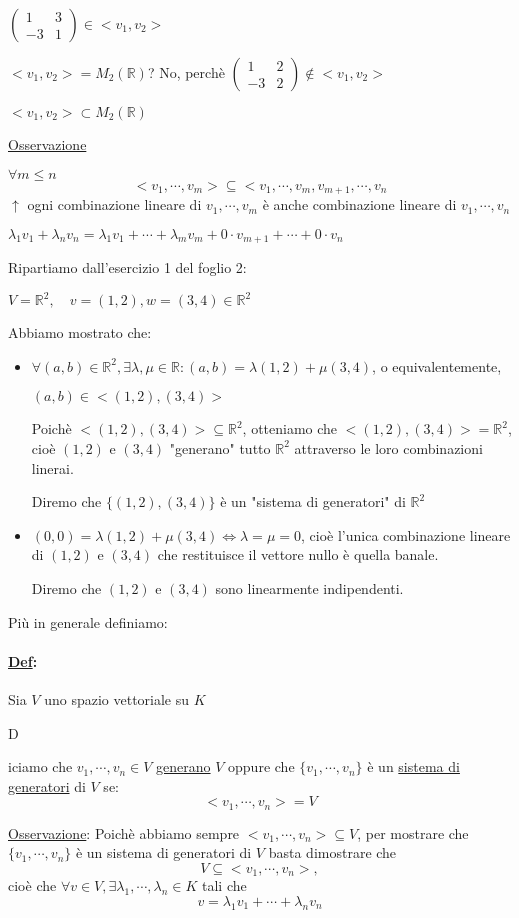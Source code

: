 \documentclass{article}
\newcommand{\ul}[1]{\underline{#1}}
\newcommand{\R}{\mathbb{R}}
\newcommand{\Def}[2]{\paragraph{\ul{Def}:}#1\\\hspace*{3em}\begin{minipage}{.8\textwidth}#2\end{minipage}}
\begin{document}
\begin{itemize}
	  $\begin{pmatrix}1&3\\-3&1\end{pmatrix}\in<v_1,v_2>$

	  $<v_1,v_2>=M_2(\R)$? No, perchè $\begin{pmatrix}1&2\\-3&2\end{pmatrix}\not\in<v_1,v_2>$

	  $<v_1,v_2>\subset M_2(\R)$

	  \ul{Osservazione}

	  $\forall m\leq n$
	  $$<v_1,\cdots,v_m>\subseteq <v_1,\cdots,v_m,v_{m+1},\cdots,v_n$$
	  $\uparrow$ ogni combinazione lineare di $v_1,\cdots,v_m$ è anche combinazione lineare di $v_1,\cdots,v_n$

	  $\lambda_1v_1+\lambda_nv_n=\lambda_1v_1+\cdots+\lambda_mv_m+0\cdot v_{m+1}+\cdots+0\cdot v_n$
\end{itemize}
Ripartiamo dall'esercizio 1 del foglio 2:

$V=\R^2,\quad v=(1,2),w=(3,4)\in\R^2$

Abbiamo mostrato che:
\begin{itemize}
	\item $\forall(a,b)\in\R^2,\exists\lambda,\mu\in\R:(a,b)=\lambda(1,2)+\mu(3,4)$, o equivalentemente,

	  $(a,b)\in<(1,2),(3,4)>$

	  Poichè $<(1,2),(3,4)>\subseteq\R^2$, otteniamo che $<(1,2),(3,4)>=\R^2$, cioè $(1,2)$ e $(3,4)$ "generano" tutto $\R^2$ attraverso le loro combinazioni linerai.

	  Diremo che $\{(1,2),(3,4)\}$ è un "sistema di generatori" di $\R^2$
	\item $(0,0)=\lambda(1,2)+\mu(3,4)\Leftrightarrow\lambda=\mu=0$, cioè l'unica combinazione lineare di $(1,2)$ e $(3,4)$ che restituisce il vettore nullo è quella banale.

	  Diremo che $(1,2)$ e $(3,4)$ sono linearmente indipendenti.
\end{itemize}

Più in generale definiamo:

\Def{Sia $V$ uno spazio vettoriale su $K$}

Diciamo che $v_1,\cdots,v_n\in V$ \ul{generano} $V$ oppure che $\{v_1,\cdots,v_n\}$ è un \ul{sistema di generatori} di $V$ se:
$$<v_1,\cdots,v_n>=V$$

\ul{Osservazione}: Poichè abbiamo sempre $<v_1,\cdots,v_n>\subseteq V$, per mostrare che $\{v_1,\cdots,v_n\}$ è un sistema di generatori di $V$ basta dimostrare che
$$V\subseteq<v_1,\cdots,v_n>,$$
cioè che $\forall v\in V,\exists\lambda_1,\cdots,\lambda_n\in K$ tali che
$$v=\lambda_1v_1+\cdots+\lambda_nv_n$$
\end{document}

